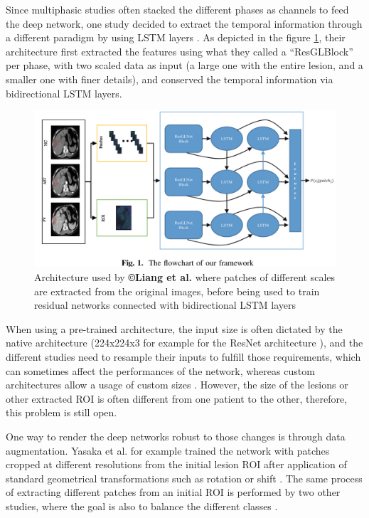 \documentclass[]{article}
\begin{document}
Since multiphasic studies often stacked the different phases as channels
to feed the deep network, one study decided to extract the temporal
information through a different paradigm by using LSTM layers \cite{Liang2018}. As depicted
in the figure \ref{Liang2018_Fig1}, their architecture first extracted the features using what they
called a ``ResGLBlock'' per phase, with two scaled data as input (a
large one with the entire lesion, and a smaller one with finer details),
and conserved the temporal information via bidirectional LSTM
layers.

\begin{figure}[th!]
\centering
\includegraphics[width=0.7\linewidth]{images/image7}
\caption{Architecture used by \textbf{©Liang et al.} where patches of different scales are extracted from the original images, before being used to train residual networks connected with bidirectional LSTM layers \cite{Liang2018}}
\label{Liang2018_Fig1}
\end{figure}



When using a pre-trained architecture, the input size is often dictated
by the native architecture (224x224x3 for example for the ResNet
architecture \cite{Peng2020,WANG2019}), and
the different studies need to resample their inputs to fulfill those
requirements, which can sometimes affect the performances of the
network, whereas custom architectures allow a usage of custom sizes \cite{Liang2018,Yasaka2018,Yasaka2018a}. However, the size of the lesions or other extracted ROI is often different from one patient to the other, therefore, this
problem is still open.

One way to render the deep networks robust to those changes is through
data augmentation. Yasaka et al. for example trained the network
with patches cropped at different resolutions from the initial lesion
ROI after application of standard geometrical transformations
such as rotation or shift \cite{Yasaka2018}. The same
process of extracting different patches from an initial ROI is performed
by two other studies, where the goal is also to balance the different
classes \cite{Yasaka2018a,Peng2020}.
\end{document}
